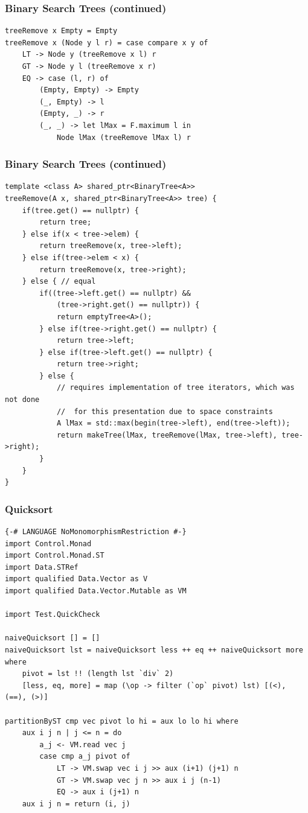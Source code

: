 \documentclass{beamer}
\begin{document}
\begin{frame}[fragile]
\frametitle{Binary Search Trees (continued)}
\begin{Verbatim}[frame=single, fontsize=\scriptsize]
treeRemove x Empty = Empty
treeRemove x (Node y l r) = case compare x y of
    LT -> Node y (treeRemove x l) r
    GT -> Node y l (treeRemove x r)
    EQ -> case (l, r) of
        (Empty, Empty) -> Empty
        (_, Empty) -> l
        (Empty, _) -> r
        (_, _) -> let lMax = F.maximum l in
            Node lMax (treeRemove lMax l) r 
\end{Verbatim}
\end{frame}

\begin{frame}[fragile]
\frametitle{Binary Search Trees (continued)}
\begin{Verbatim}[frame=single, fontsize=\scriptsize]
template <class A> shared_ptr<BinaryTree<A>>
treeRemove(A x, shared_ptr<BinaryTree<A>> tree) {
    if(tree.get() == nullptr) {
        return tree;
    } else if(x < tree->elem) {
        return treeRemove(x, tree->left);
    } else if(tree->elem < x) {
        return treeRemove(x, tree->right);
    } else { // equal
        if((tree->left.get() == nullptr) &&
            (tree->right.get() == nullptr)) {
            return emptyTree<A>();
        } else if(tree->right.get() == nullptr) {
            return tree->left;
        } else if(tree->left.get() == nullptr) {
            return tree->right;
        } else {
            // requires implementation of tree iterators, which was not done
            //  for this presentation due to space constraints
            A lMax = std::max(begin(tree->left), end(tree->left));
            return makeTree(lMax, treeRemove(lMax, tree->left), tree->right);
        }
    }
}
\end{Verbatim}
\end{frame}

\begin{frame}[fragile]
\frametitle{Quicksort}
\begin{Verbatim}[frame=single, fontsize=\scriptsize]
{-# LANGUAGE NoMonomorphismRestriction #-}
import Control.Monad
import Control.Monad.ST
import Data.STRef
import qualified Data.Vector as V
import qualified Data.Vector.Mutable as VM

import Test.QuickCheck

naiveQuicksort [] = []
naiveQuicksort lst = naiveQuicksort less ++ eq ++ naiveQuicksort more where
    pivot = lst !! (length lst `div` 2)
    [less, eq, more] = map (\op -> filter (`op` pivot) lst) [(<), (==), (>)]

partitionByST cmp vec pivot lo hi = aux lo lo hi where
    aux i j n | j <= n = do 
        a_j <- VM.read vec j 
        case cmp a_j pivot of
            LT -> VM.swap vec i j >> aux (i+1) (j+1) n
            GT -> VM.swap vec j n >> aux i j (n-1)
            EQ -> aux i (j+1) n
    aux i j n = return (i, j)
\end{Verbatim}
\end{frame}
\end{document}
